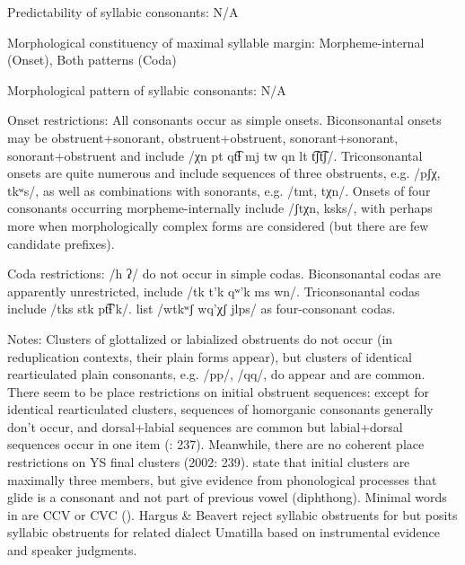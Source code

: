 {\begin{appendixdesc}
\item[Predictability of syllabic consonants:] N/A

\item[Morphological constituency of maximal syllable margin:] Morpheme-internal (Onset), Both patterns (Coda)

\item[Morphological pattern of syllabic consonants:] N/A

\item[Onset restrictions:] All consonants occur as simple onsets. Biconsonantal onsets may be obstruent+sonorant, obstruent+obstruent, sonorant+sonorant, sonorant+obstruent and include /χn pt qt͡ɬ mj tw qn lt t͡ʃt͡ʃ/. Triconsonantal onsets are quite numerous and include sequences of three obstruents, e.g. /pʃχ, tkʷs/, as well as combinations with sonorants, e.g. /tmt, tχn/. Onsets of four consonants occurring morpheme-internally include /ʃtχn, ksks/, with perhaps more when morphologically complex forms are considered (but there are few candidate prefixes).

\item[Coda restrictions:] /h ʔ/ do not occur in simple codas. Biconsonantal codas are apparently unrestricted, include /tk t’k qʷ'k ms wn/. Triconsonantal codas include /tks stk pt͡ɬ’k/. \citet{HargusBeavert2006} list /wtkʷʃ wq’χʃ jlps/ as four-consonant codas.

\item[Notes:] Clusters of glottalized or labialized obstruents do not occur (in reduplication contexts, their plain forms appear), but clusters of identical rearticulated plain consonants, e.g. /pp/, /qq/, do appear and are common. There seem to be place restrictions on initial obstruent sequences: except for identical rearticulated clusters, sequences of homorganic consonants generally don’t occur, and dorsal+labial sequences are common but labial+dorsal sequences occur in one item (\citealt{HargusBeavert2002}: 237). Meanwhile, there are no coherent place restrictions on YS final clusters (2002: 239). \citet{RigsbyRude1996} state that initial clusters are maximally three members, but \citet{HargusBeavert2006} give evidence from phonological processes that glide is a consonant and not part of previous vowel (diphthong). Minimal words in  are CCV or CVC (\citealt{HargusBeavert2006}). Hargus \& Beavert reject syllabic obstruents for  but \citet{Minthorn2005} posits syllabic obstruents for related dialect Umatilla based on instrumental evidence and speaker judgments.
\end{appendixdesc}
}
